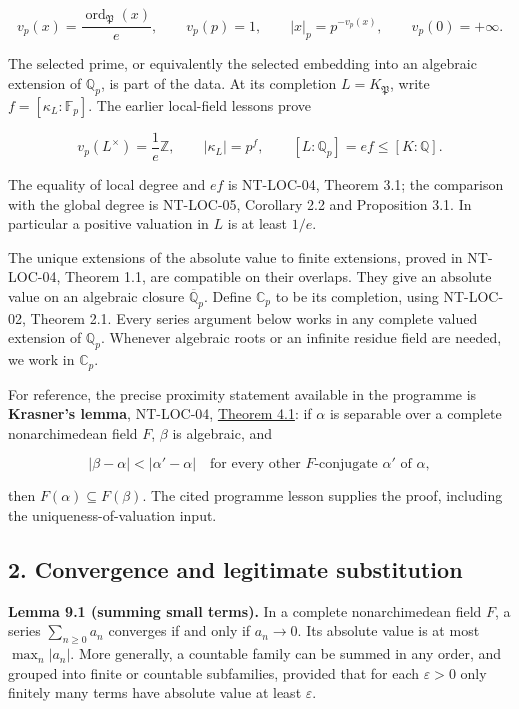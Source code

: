 \documentclass[
  11pt,
  a4paper,
]{article}
\begin{document}
\[
v_p(x)=\frac{\operatorname{ord}_{\mathfrak P}(x)}e,
\qquad v_p(p)=1,
\qquad |x|_p=p^{-v_p(x)},
\qquad v_p(0)=+\infty.
\tag{9.1}
\]

The selected prime, or equivalently the selected embedding into an
algebraic extension of \(\mathbb Q_p\), is part of the data. At its
completion \(L=K_{\mathfrak P}\), write \(f=[\kappa_L:\mathbb F_p]\).
The earlier local-field lessons prove

\[
v_p(L^\times)=\frac1e\mathbb Z,
\qquad |\kappa_L|=p^f,
\qquad [L:\mathbb Q_p]=ef\le [K:\mathbb Q].
\tag{9.2}
\]

The equality of local degree and \(ef\) is NT-LOC-04, Theorem 3.1; the
comparison with the global degree is NT-LOC-05, Corollary 2.2 and
Proposition 3.1. In particular a positive valuation in \(L\) is at least
\(1/e\).

The unique extensions of the absolute value to finite extensions, proved
in NT-LOC-04, Theorem 1.1, are compatible on their overlaps. They give
an absolute value on an algebraic closure \(\overline{\mathbb Q}_p\).
Define \(\mathbb C_p\) to be its completion, using NT-LOC-02, Theorem
2.1. Every series argument below works in any complete valued extension
of \(\mathbb Q_p\). Whenever algebraic roots or an infinite residue
field are needed, we work in \(\mathbb C_p\).

For reference, the precise proximity statement available in the
programme is \textbf{Krasner's lemma}, NT-LOC-04,
\href{https://kokunoyumeto.github.io/open-math-courses-public/courses/NT-LOC/NT-LOC-04.html\#4-when-proximity-forces-containment}{Theorem
4.1}: if \(\alpha\) is separable over a complete nonarchimedean field
\(F\), \(\beta\) is algebraic, and

\[
|\beta-\alpha|<|\alpha'-\alpha|
\quad\text{for every other }F\text{-conjugate }\alpha'\text{ of }\alpha,
\]

then \(F(\alpha)\subseteq F(\beta)\). The cited programme lesson
supplies the proof, including the uniqueness-of-valuation input.

\subsection{2. Convergence and legitimate
substitution}\label{convergence-and-legitimate-substitution}

\textbf{Lemma 9.1 (summing small terms).} In a complete nonarchimedean
field \(F\), a series \(\sum_{n\ge0}a_n\) converges if and only if
\(a_n\to0\). Its absolute value is at most \(\max_n|a_n|\). More
generally, a countable family can be summed in any order, and grouped
into finite or countable subfamilies, provided that for each
\(\varepsilon>0\) only finitely many terms have absolute value at least
\(\varepsilon\).
\end{document}
